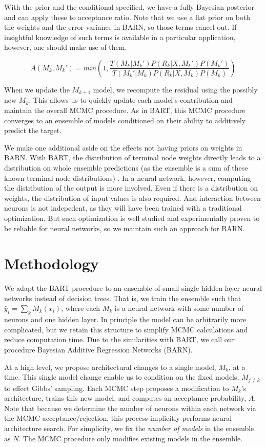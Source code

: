 \documentclass[12pt]{article}
\begin{document}
With the prior and the conditional specified, we have a fully Bayesian posterior and can apply these to acceptance ratio.  Note that we use a flat prior on both the weights and the error variance in BARN, so those terms cancel out.  If insightful knowledge of such terms is available in a particular application, however, one should make use of them.

$$
A(M_k,M_k') = min(1, \frac{T(M_k|M_k') P(R_k|X,M_k')P(M_k')}{T(M_k'|M_k) P(R_k|X,M_k)P(M_k)})
$$

When we update the $M_{k+1}$ model, we recompute the residual using the possibly new $M_k$.  This allows us to quickly update each model's contribution and maintain the overall MCMC procedure.  As in BART, this MCMC procedure converges to an ensemble of models conditioned on their ability to additively predict the target.

We make one additional aside on the effects not having priors on weights in BARN.  With BART, the distribution of terminal node weights directly leads to a distribution on whole ensemble predictions (as the ensemble is a sum of these known terminal node distributions) \cite{chipman2010bart}.  In a neural network, however, computing the distribution of the output is more involved.  Even if there is a distribution on weights, the distribution of input values is also required.  And interaction between neurons is not indepedent, as they will have been trained with a traditional optimization.  But such optimization is well studied and experimentally proven to be reliable \cite{kingma2014adam} for neural networks, so we maintain such an approach for BARN.

\section{Methodology}\label{sec:method}

We adapt the BART procedure \cite{chipman2010bart} to an ensemble of small single-hidden layer neural networks instead of decision trees.  That is, we train the ensemble such that $\hat{y}_i = \sum_k M_k(x_i)$, where each $M_k$ is a neural network with some number of neurons and one hidden layer.  In principle the model can be arbitrarily more complicated, but we retain this structure to simplify MCMC calculations and reduce computation time.  Due to the similarities with BART, we call our procedure Bayesian Additive Regression Networks (BARN).

At a high level, we propose architectural changes to a single model, $M_k$, at a time.  This single model change enable us to condition on the fixed models, $M_{j\neq k}$ to effect Gibbs' sampling.  Each MCMC step proposes a modification to $M_k$'s architecture, trains this new model, and computes an acceptance probability, $A$.  Note that because we determine the number of neurons within each network via the MCMC acceptance/rejection, this process implicitly performs neural architecture search.  For simplicity, we fix the \emph{number of models} in the ensemble as $N$.  The MCMC procedure only modifies existing models in the ensemble.
\end{document}
